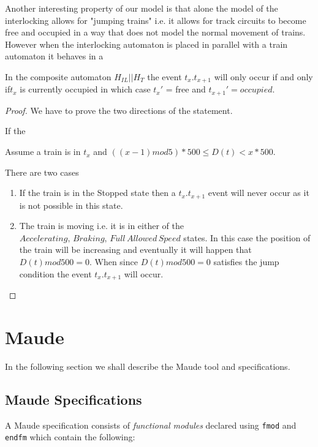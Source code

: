 Another interesting property of our model is that alone the model of the interlocking allows for "jumping trains" i.e. it allows for track circuits to become free and occupied in a way that does not model the normal movement of trains.
However when the interlocking automaton is placed in parallel with a train automaton it behaves in a

\begin{mytheorem}

In the composite automaton $H_{IL}|| H_{T} $  the event $t_x.t_{x+1}$ will only occur if  and only if$t_x$ is currently occupied in which case $t_x'$ = free and $t_{x+1}' = occupied$.


\begin{proof}
We have to prove the two directions of the statement.

If the 





Assume a train is in $t_x$ and $((x-1) mod 5) * 500 \leq D(t) < x *500$.

There are two cases
\begin{enumerate}
\item If the train is in the Stopped state then a $t_{x}.t_{x+1}$ event will never occur as it is not possible in this state.

\item The train is moving i.e. it is in either of the $Accelerating, \, Braking , \,  Full \, Allowed \, Speed$ states. In this case the position of the train will be increasing and eventually it will happen that $D(t)  mod 500 = 0$. When since $D(t) mod 500 = 0$  satisfies the jump condition the event
 $t_{x}.t_{x+ 1}$ will occur.  
 

\end{enumerate}
\end{proof}
\end{mytheorem}


\section{Maude}
In the following section we shall describe the Maude tool and specifications. 
\subsection{Maude Specifications}

A Maude specification consists of \emph{functional modules} declared using \texttt{fmod} and \texttt{endfm} which contain the following:

